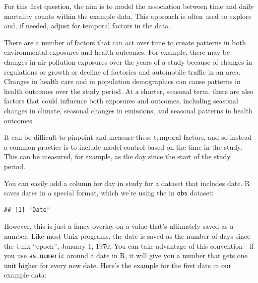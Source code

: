 \documentclass[
]{book}
\newenvironment{Shaded}{\begin{snugshade}}{\end{snugshade}}
\newcommand{\DecValTok}[1]{\textcolor[rgb]{0.00,0.00,0.81}{#1}}
\newcommand{\KeywordTok}[1]{\textcolor[rgb]{0.13,0.29,0.53}{\textbf{#1}}}
\newcommand{\NormalTok}[1]{#1}
\newcommand{\OperatorTok}[1]{\textcolor[rgb]{0.81,0.36,0.00}{\textbf{#1}}}
\begin{document}
For this first question, the aim is to model the association between time and
daily mortality counts within the example data. This approach is often used
to explore and, if needed, adjust for temporal factors in the data.

There are a number of factors that can act over time to create patterns in both
environmental exposures and health outcomes. For example, there may be changes
in air pollution exposures over the years of a study because of changes in
regulations or growth or decline of factories and automobile traffic in an area.
Changes in health care and in population demographics can cause patterns in
health outcomes over the study period. At a shorter, seasonal term, there are
also factors that could influence both exposures and outcomes, including
seasonal changes in climate, seasonal changes in emissions, and seasonal
patterns in health outcomes.

It can be difficult to pinpoint and measure these temporal factors, and so
instead a common practice is to include model control based on the time in the
study. This can be measured, for example, as the day since the start of the
study period.

You can easily add a column for day in study for a dataset that
includes date. R saves dates in a special format, which we're using the in
\texttt{obs} dataset:

\begin{Shaded}
\end{Shaded}

\begin{verbatim}
## [1] "Date"
\end{verbatim}

However, this is just a fancy overlay on a value that's ultimately saved as
a number. Like most Unix programs, the date is saved as the number of days
since the Unix ``epoch'', January 1, 1970. You can take advantage of this
convention---if you use \texttt{as.numeric} around a date in R, it will give you a
number that gets one unit higher for every new date. Here's the example for
the first date in our example data:

\begin{Shaded}
\end{Shaded}
\end{document}
